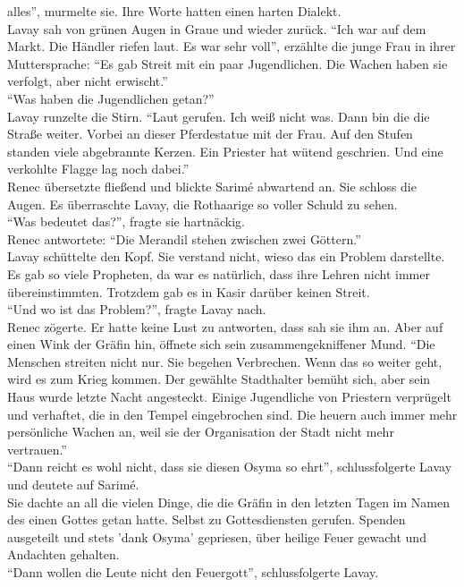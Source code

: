alles'', murmelte sie. Ihre Worte hatten einen harten Dialekt.\\
Lavay sah von grünen Augen in Graue und wieder zurück. ``Ich war auf dem Markt. Die Händler riefen 
laut. Es war sehr voll'', erzählte die junge Frau in ihrer Muttersprache: ``Es gab Streit mit ein 
paar Jugendlichen. Die Wachen haben sie verfolgt, aber nicht erwischt.''\\
``Was haben die Jugendlichen getan?''\\
Lavay runzelte die Stirn. ``Laut gerufen. Ich weiß nicht was. Dann bin die die Straße weiter. 
Vorbei an dieser Pferdestatue mit der Frau. Auf den Stufen standen viele abgebrannte Kerzen. Ein 
Priester hat wütend geschrien. Und eine verkohlte Flagge lag noch dabei.''\\
Renec übersetzte fließend und blickte Sarimé abwartend an. Sie schloss die Augen. Es überraschte 
Lavay, die Rothaarige so voller Schuld zu sehen.\\
``Was bedeutet das?'', fragte sie hartnäckig.\\
Renec antwortete: ``Die Merandil stehen zwischen zwei Göttern.''\\
Lavay schüttelte den Kopf. Sie verstand nicht, wieso das ein Problem darstellte. Es gab so viele 
Propheten, da war es natürlich, dass ihre Lehren nicht immer übereinstimmten. Trotzdem gab es 
in Kasir darüber keinen Streit.\\
``Und wo ist das Problem?'', fragte Lavay nach.\\
Renec zögerte. Er hatte keine Lust zu antworten, dass sah sie ihm an. Aber auf einen Wink der 
Gräfin hin, öffnete sich sein zusammengekniffener Mund. ``Die Menschen streiten nicht nur. Sie 
begehen Verbrechen. Wenn das so weiter geht, wird es zum Krieg kommen. Der gewählte Stadthalter 
bemüht sich, aber sein Haus wurde letzte Nacht angesteckt. Einige Jugendliche von Priestern 
verprügelt und verhaftet, die in den Tempel eingebrochen sind. Die heuern auch immer mehr 
persönliche Wachen an, weil sie der Organisation der Stadt nicht mehr vertrauen.''\\
``Dann reicht es wohl nicht, dass sie diesen Osyma so ehrt'', schlussfolgerte Lavay und deutete auf 
Sarimé.\\
Sie dachte an all die vielen Dinge, die die Gräfin in den letzten Tagen im Namen des einen Gottes 
getan hatte. Selbst zu Gottesdiensten gerufen. Spenden ausgeteilt und stets 'dank Osyma' 
gepriesen, über heilige Feuer gewacht und Andachten gehalten.\\
``Dann wollen die Leute nicht den Feuergott'', schlussfolgerte Lavay.\\
